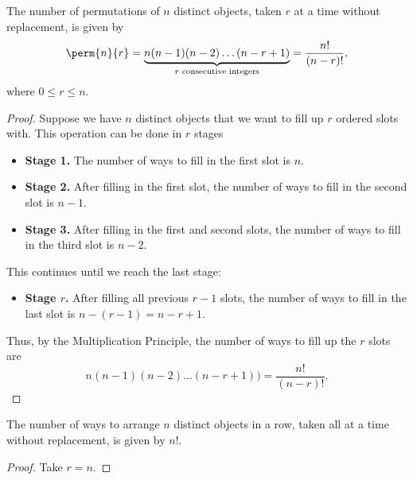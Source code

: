 \begin{proposition}
    The number of permutations of $n$ distinct objects, taken $r$ at a time without replacement, is given by \[\perm{n}{r} = \underbrace{n(n-1)(n-2)\dots(n-r+1)}_{\text{$r$ consecutive integers}} = \frac{n!}{(n-r)!},\] where $0 \leq r \leq n$.
\end{proposition}
\begin{proof}
    Suppose we have $n$ distinct objects that we want to fill up $r$ ordered slots with. This operation can be done in $r$ stages
    \begin{itemize}
        \item \textbf{Stage 1.} The number of ways to fill in the first slot is $n$.
        \item \textbf{Stage 2.} After filling in the first slot, the number of ways to fill in the second slot is $n-1$.
        \item \textbf{Stage 3.} After filling in the first and second slots, the number of ways to fill in the third slot is $n-2$.
    \end{itemize}
    This continues until we reach the last stage:
    \begin{itemize}
        \item \textbf{Stage $r$.} After filling all previous $r-1$ slots, the number of ways to fill in the last slot is $n-(r-1) = n-r+1$.
    \end{itemize}
    Thus, by the Multiplication Principle, the number of ways to fill up the $r$ slots are \[n(n-1)(n-2)\dots(n-r+1)) = \frac{n!}{(n-r)!}.\]
\end{proof}

\begin{corollary}
    The number of ways to arrange $n$ distinct objects in a row, taken all at a time without replacement, is given by $n!$.
\end{corollary}
\begin{proof}
    Take $r = n$.
\end{proof}

